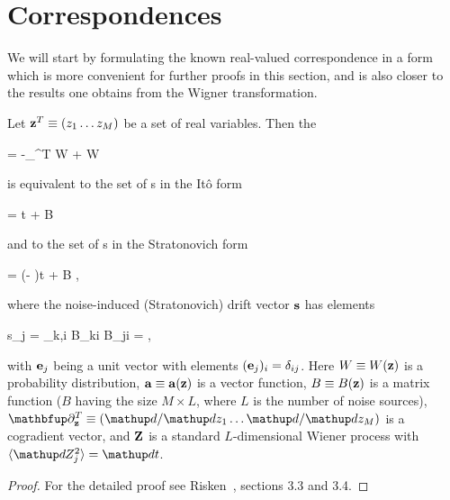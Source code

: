 \section{Correspondences}

We will start by formulating the known real-valued correspondence in a form which is more convenient for further proofs in this section, and is also closer to the results one obtains from the Wigner transformation.

\begin{lemma}
\label{lmm:fpe-sde:corr:fpe-sde-real}
	Let $\mathbf{z}^T \equiv (z_1 \ldots z_M)$ be a set of real variables.
	Then the 
	\begin{eqn*}
		= -\vcwd_{\zvec}^T \cdot \avec W
		+   W
	\end{eqn*}
	is equivalent to the set of s in the It\^o form
	\begin{eqn*}
		\upd\zvec = \avec \upd t + B \upd\Zvec
	\end{eqn*}
	and to the set of s in the Stratonovich form
	\begin{eqn*}
		\upd\zvec = (\avec - \svec)\upd t + B \upd\Zvec,
	\end{eqn*}
	where the noise-induced (Stratonovich) drift vector $\mathbf{s}$ has elements
	\begin{eqn*}
		s_j
		=  \sum_{k,i} B_{ki}  B_{ji}
		=  \Trace{B^T \vcwd_{\zvec} \evec_j^T B},
	\end{eqn*}
	with $\mathbf{e}_j$ being a unit vector with elements $(\mathbf{e}_j)_i = \delta_{ij}$.
	Here $W \equiv W(\mathbf{z})$ is a probability distribution, $\mathbf{a} \equiv \mathbf{a}(\mathbf{z})$ is a vector function, $B \equiv B(\mathbf{z})$ is a matrix function ($B$ having the size $M \times L$, where $L$ is the number of noise sources), $\vcwd_{\zvec}^T \equiv (\upd/\upd z_1 \ldots \upd/\upd z_M)$ is a cogradient vector, and $\mathbf{Z}$ is a standard $L$-dimensional Wiener process with $\langle \upd Z_j^2 \rangle = \upd t$.
\end{lemma}
\begin{proof}
For the detailed proof see Risken~\cite{Risken1996}, sections 3.3 and 3.4.
\end{proof}

